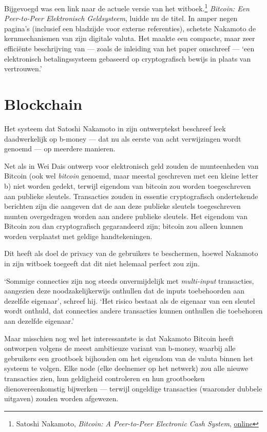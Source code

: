 \documentclass[
  a5paper,
  smalldemyvopaper,11pt,twoside,onecolumn,openright,extrafontsizes,
hidelinks]{memoir}
\begin{document}
Bijgevoegd was een link naar de actuele versie van het
witboek.\footnote{Satoshi Nakamoto, \emph{Bitcoin: A Peer-to-Peer
  Electronic Cash System},
  \href{https://bitcoin.org/bitcoin.pdf}{online}} \emph{Bitcoin: Een
Peer-to-Peer Elektronisch Geldsysteem}, luidde nu de titel. In amper
negen pagina's (inclusief een bladzijde voor externe referenties),
schetste Nakamoto de kernmechanismen van zijn digitale valuta. Het
maakte een compacte, maar zeer efficiënte beschrijving van --- zoals de
inleiding van het paper omschreef --- `een elektronisch betalingssysteem
gebaseerd op cryptografisch bewijs in plaats van vertrouwen.'

\section{Blockchain}\label{blockchain}

Het systeem dat Satoshi Nakamoto in zijn ontwerptekst beschreef leek
daadwerkelijk op b-money --- dat nu als eerste van acht verwijzingen
wordt genoemd --- op meerdere manieren.

Net als in Wei Dais ontwerp voor elektronisch geld zouden de
munteenheden van Bitcoin (ook wel \emph{bitcoin} genoemd, maar meestal
geschreven met een kleine letter b) niet worden gedekt, terwijl eigendom
van bitcoin zou worden toegeschreven aan publieke sleutels. Transacties
zouden in essentie cryptografisch ondertekende berichten zijn die
aangeven dat de aan deze publieke sleutels toegeschreven munten
overgedragen worden aan andere publieke sleutels. Het eigendom van
Bitcoin zou dan cryptografisch gegarandeerd zijn; bitcoin zou alleen
kunnen worden verplaatst met geldige handtekeningen.

Dit heeft als doel de privacy van de gebruikers te beschermen, hoewel
Nakamoto in zijn witboek toegeeft dat dit niet helemaal perfect zou
zijn.

`Sommige connecties zijn nog steeds onvermijdelijk met
\emph{multi-input} transacties, aangezien deze noodzakelijkerwijs
onthullen dat de inputs toebehoorden aan dezelfde eigenaar', schreef
hij. `Het risico bestaat als de eigenaar van een sleutel wordt onthuld,
dat connecties andere transacties kunnen onthullen die toebehoren aan
dezelfde eigenaar.'

Maar misschien nog wel het interessantste is dat Nakamoto Bitcoin heeft
ontworpen volgens de meest ambitieuze variant van b-money, waarbij alle
gebruikers een grootboek bijhouden om het eigendom van de valuta binnen
het systeem te volgen. Elke node (elke deelnemer op het netwerk) zou
alle nieuwe transacties zien, hun geldigheid controleren en hun
grootboeken dienovereenkomstig bijwerken --- terwijl ongeldige
transacties (waaronder dubbele uitgaven) zouden worden afgewezen.
\end{document}
